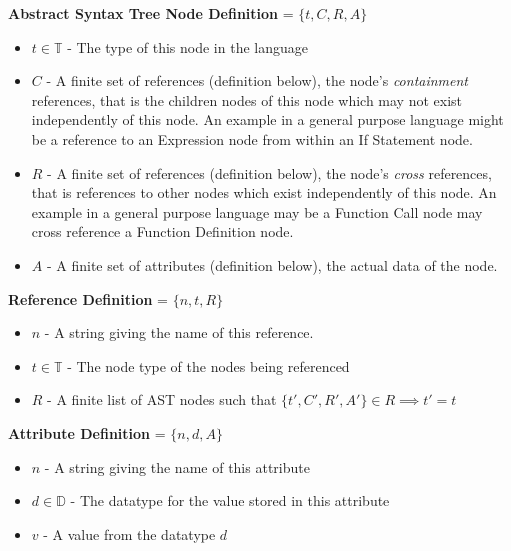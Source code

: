 \documentclass{article}
\begin{document}
\textbf{Abstract Syntax Tree Node Definition} = $\{t,C,R,A\}$ 
\begin{itemize}
\item $t\in \mathbb{T}$ - The type of this node in the language
\item $C$ - A finite set of references (definition below), the node's \emph{containment} references, that is the children nodes of this node which may not exist independently of this node. An example in a general purpose language might be a reference to an Expression node from within an If Statement node.
\item $R$ - A finite set of references (definition below), the node's \emph{cross} references, that is references to other nodes which exist independently of this node. An example in a general purpose language may be a Function Call node may cross reference a Function Definition node.
\item $A$ - A finite set of attributes (definition below), the actual data of the node.
\end{itemize}
%
\textbf{Reference Definition} = $\{n,t,R\}$ 
\begin{itemize}
\item $n$ - A string giving the name of this reference.
\item $t\in \mathbb{T}$ - The node type of the nodes being referenced 
\item $R$ - A finite list of AST nodes such that $\{t',C',R',A'\} \in R \implies t'=t$
\end{itemize}
%
\textbf{Attribute Definition} = $\{n,d,A\}$ 
\begin{itemize}
\item $n$ - A string giving the name of this attribute
\item $d\in \mathbb{D}$ - The datatype for the value stored in this attribute
\item $v$ - A value from the datatype $d$
\end{itemize}
%
\end{document}

